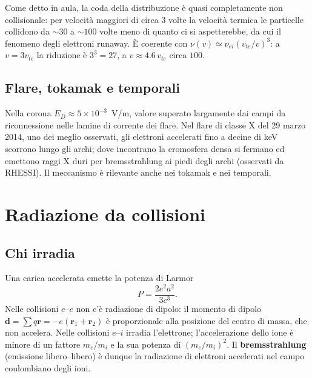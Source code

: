 Come detto in aula, la coda della distribuzione è quasi completamente non collisionale: per velocità maggiori di circa $3$ volte la velocità termica le particelle collidono da $\sim30$ a $\sim100$ volte meno di quanto ci si aspetterebbe, da cui il fenomeno degli elettroni runaway. È coerente con $\nu(v)\simeq\nu_{ei}(v_{te}/v)^3$: a $v=3v_{te}$ la riduzione è $3^3=27$, a $v\approx4.6\,v_{te}$ circa $100$.

\subsection{Flare, tokamak e temporali}
Nella corona $E_D\approx5\times10^{-3}$~V/m, valore superato largamente dai campi da riconnessione nelle lamine di corrente dei flare. Nel flare di classe X del 29 marzo 2014, uno dei meglio osservati, gli elettroni accelerati fino a decine di keV scorrono lungo gli archi; dove incontrano la cromosfera densa si fermano ed emettono raggi X duri per bremsstrahlung ai piedi degli archi (osservati da RHESSI). Il meccanismo è rilevante anche nei tokamak e nei temporali.

\section{Radiazione da collisioni}

\subsection{Chi irradia}
Una carica accelerata emette la potenza di Larmor
\begin{equation}
P=\frac{2e^2a^2}{3c^3}.
\end{equation}
Nelle collisioni $e$--$e$ non c'è radiazione di dipolo: il momento di dipolo $\mathbf{d}=\sum q\mathbf{r}=-e(\mathbf{r}_1+\mathbf{r}_2)$ è proporzionale alla posizione del centro di massa, che non accelera. Nelle collisioni $e$--$i$ irradia l'elettrone; l'accelerazione dello ione è minore di un fattore $m_e/m_i$ e la sua potenza di $(m_e/m_i)^2$.
Il \textbf{bremsstrahlung} (emissione libero--libero) è dunque la radiazione di elettroni accelerati nel campo coulombiano degli ioni.

